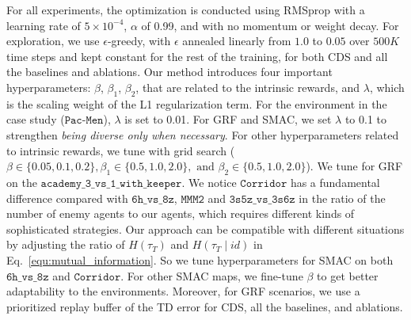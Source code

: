 For all experiments, the optimization is conducted using RMSprop with a learning rate of $5 \times 10^{-4}$, $\alpha$ of 0.99, and with no momentum or weight decay. For exploration, we use $\epsilon$-greedy, with $\epsilon$ annealed linearly from $1.0$ to $0.05$ over $500K$ time steps and kept constant for the rest of the training, for both CDS and all the baselines and ablations. Our method introduces four important hyperparameters: $\beta$, $\beta_1$, $\beta_2$, that are related to the intrinsic rewards, and $\lambda$, which is the scaling weight of the L1 regularization term. For the environment in the case study ($\mathtt{Pac}$-$\mathtt{Men}$), $\lambda$ is set to 0.01. For GRF and SMAC, we set $\lambda$ to 0.1 to strengthen \emph{being diverse only when necessary}. For other hyperparameters related to intrinsic rewards, we tune with grid search ($\beta \in\{0.05,0.1,0.2\}, \beta_{1} \in\{0.5,1.0,2.0\}, \text { and } \beta_{2} \in\{0.5,1.0,2.0\}$). We tune for GRF on the $\mathtt{academy\_3\_vs\_1\_with\_keeper}$. We notice $\mathtt{Corridor}$ has a fundamental difference compared with $\mathtt{6h\_vs\_8z}$, $\mathtt{MMM2}$ and $\mathtt{3s5z\_vs\_3s6z}$ in the ratio of the number of enemy agents to our agents, which requires different kinds of sophisticated strategies. Our approach can be compatible with different situations by adjusting the ratio of $H\left(\tau_{T}\right)$ and $H\left(\tau_{T} \mid i d\right)$ in Eq.~\ref{equ:mutual_information}. So we tune hyperparameters for SMAC on both $\mathtt{6h\_vs\_8z}$ and $\mathtt{Corridor}$. For other SMAC maps, we fine-tune $\beta$ to get better adaptability to the environments. Moreover, for GRF scenarios, we use a prioritized replay buffer of the TD error for CDS, all the baselines, and ablations.

